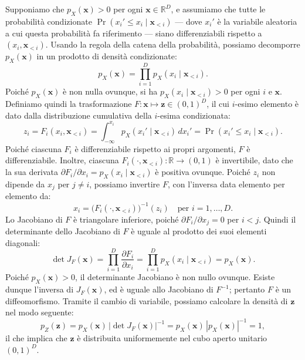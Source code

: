 Supponiamo che $p_X(\mathbf{x}) > 0$ per ogni $\mathbf{x} \in \mathbb{R}^D$, e assumiamo che tutte le probabilità condizionate $\Pr(x_i' \le x_i \mid \mathbf{x}_{<i})$ — dove $x_i'$ è la variabile aleatoria a cui questa probabilità fa riferimento — siano differenziabili rispetto a $(x_i, \mathbf{x}_{<i})$. Usando la regola della catena della probabilità, possiamo decomporre $p_X(\mathbf{x})$ in un prodotto di densità condizionate:
\begin{equation}
    p_X(\mathbf{x}) = \prod_{i=1}^{D} p_X(x_i \mid \mathbf{x}_{<i}).
\end{equation}
Poiché $p_X(\mathbf{x})$ è non nulla ovunque, si ha $p_X(x_i \mid \mathbf{x}_{<i}) > 0$ per ogni $i$ e $\mathbf{x}$. Definiamo quindi la trasformazione $F : \mathbf{x} \mapsto \mathbf{z} \in (0,1)^D$, il cui $i$-esimo elemento è dato dalla distribuzione cumulativa della $i$-esima condizionata:
\begin{equation}
    z_i = F_i(x_i, \mathbf{x}_{<i}) = \int_{-\infty}^{x_i} p_X(x_i' \mid \mathbf{x}_{<i}) \, dx_i' = \Pr(x_i' \le x_i \mid \mathbf{x}_{<i}).
\end{equation}
Poiché ciascuna $F_i$ è differenziabile rispetto ai propri argomenti, $F$ è differenziabile. Inoltre, ciascuna $F_i(\cdot, \mathbf{x}_{<i}) : \mathbb{R} \to (0,1)$ è invertibile, dato che la sua derivata $\partial F_i / \partial x_i = p_X(x_i \mid \mathbf{x}_{<i})$ è positiva ovunque. Poiché $z_i$ non dipende da $x_j$ per $j \ne i$, possiamo invertire $F$, con l'inversa data elemento per elemento da:
\begin{equation}
    x_i = \big(F_i(\cdot, \mathbf{x}_{<i})\big)^{-1}(z_i) \quad \text{per } i = 1, \dots, D.
\end{equation}
Lo Jacobiano di $F$ è triangolare inferiore, poiché $\partial F_i / \partial x_j = 0$ per $i < j$. Quindi il determinante dello Jacobiano di $F$ è uguale al prodotto dei suoi elementi diagonali:
\begin{equation}
    \det J_F(\mathbf{x}) = \prod_{i=1}^{D} \frac{\partial F_i}{\partial x_i} = \prod_{i=1}^{D} p_X(x_i \mid \mathbf{x}_{<i}) = p_X(\mathbf{x}).
\end{equation}
Poiché $p_X(\mathbf{x}) > 0$, il determinante Jacobiano è non nullo ovunque. Esiste dunque l'inversa di $J_F(\mathbf{x})$, ed è uguale allo Jacobiano di $F^{-1}$; pertanto $F$ è un diffeomorfismo. Tramite il cambio di variabile, possiamo calcolare la densità di $\mathbf{z}$ nel modo seguente:
\begin{equation}
    p_Z(\mathbf{z}) = p_X(\mathbf{x}) \, |\det J_F(\mathbf{x})|^{-1} = p_X(\mathbf{x}) \, |p_X(\mathbf{x})|^{-1} = 1,
\end{equation}
il che implica che $\mathbf{z}$ è distribuita uniformemente nel cubo aperto unitario $(0,1)^D$.

